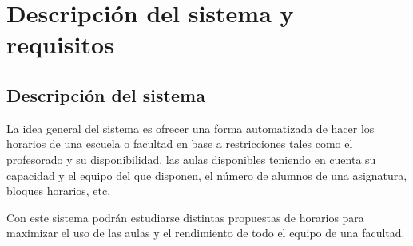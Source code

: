\chapter{Descripción del sistema y requisitos}

\section{Descripción del sistema}

La idea general del sistema es ofrecer una forma automatizada de hacer los horarios de una escuela o facultad en base a restricciones tales como el profesorado y su disponibilidad, las aulas disponibles teniendo en cuenta su capacidad y el equipo del que disponen, el número de alumnos de una asignatura, bloques horarios, etc. 

Con este sistema podrán estudiarse distintas propuestas de horarios para maximizar el uso de las aulas y el rendimiento de todo el equipo de una facultad. 


